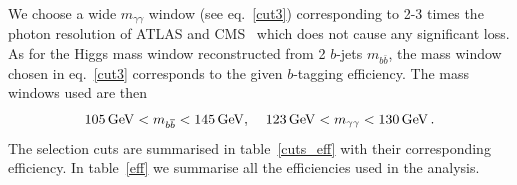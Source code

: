 We choose a wide $m_{\gamma \gamma}$  window (see eq.~\eqref{cut3}) corresponding to 2-3 times the photon resolution of ATLAS and CMS~\cite{ATL-PHYS-PUB-2013-009,CMS:2013aoa} which does not cause any significant loss. As for the Higgs  mass window reconstructed from 2 $b$-jets $ m_{b\bar b}$, the mass window chosen in eq.~\eqref{cut3} corresponds to the given $b$-tagging efficiency. The mass windows used are then
\begin{equation}
	105\,\GeV < m_{b \bar b} < 145 \, \GeV, \; \; \; \;123\, \GeV < m_{\gamma \gamma} < 130 \, \GeV\,.
	\label{cut3}
\end{equation}
The selection cuts are summarised in table~\ref{cuts_eff} with their corresponding efficiency. In table~\ref{eff} we summarise all the efficiencies used in the analysis.

